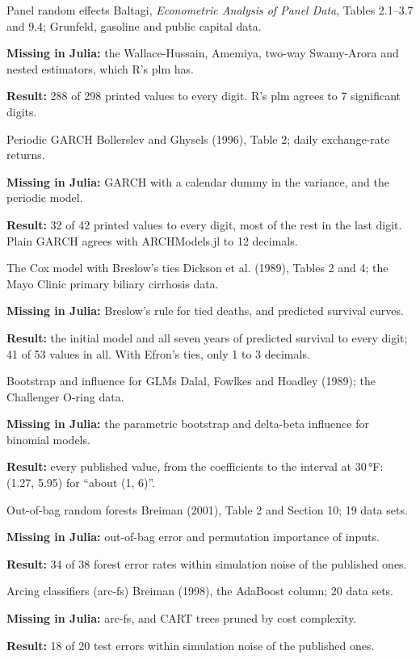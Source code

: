 \documentclass[10pt,a4paper]{article}
\begin{document}
\vspace{3mm}
\newcommand{\methodcard}[5]{%
  \begin{pbox}[equal height group=#1, fontupper=\small\raggedright]{#2}
  {\color{soft}#3}\par\smallskip
  \textbf{Missing in Julia:} #4\par\smallskip
  \textbf{Result:} #5
  \end{pbox}}
\newcommand{\cardcol}{\begin{minipage}[t]{0.320\linewidth}\vspace{0pt}}
\cardcol
\methodcard{nm1}{Panel random effects}
  {Baltagi, \emph{Econometric Analysis of Panel Data}, Tables 2.1--3.7 and 9.4; Grunfeld, gasoline and public capital data.}
  {the Wallace-Hussain, Amemiya, two-way Swamy-Arora and nested estimators, which R's plm has.}
  {288 of 298 printed values to every digit. R's plm agrees to 7 significant digits.}
\end{minipage}\hfill
\cardcol
\methodcard{nm1}{Periodic GARCH}
  {Bollerslev and Ghysels (1996), Table 2; daily exchange-rate returns.}
  {GARCH with a calendar dummy in the variance, and the periodic model.}
  {32 of 42 printed values to every digit, most of the rest in the last digit. Plain GARCH agrees with ARCHModels.jl to 12 decimals.}
\end{minipage}\hfill
\cardcol
\methodcard{nm1}{The Cox model with Breslow's ties}
  {Dickson et al. (1989), Tables 2 and 4; the Mayo Clinic primary biliary cirrhosis data.}
  {Breslow's rule for tied deaths, and predicted survival curves.}
  {the initial model and all seven years of predicted survival to every digit; 41 of 53 values in all. With Efron's ties, only 1 to 3 decimals.}
\end{minipage}

\vspace{3mm}
\cardcol
\methodcard{nm2}{Bootstrap and influence for GLMs}
  {Dalal, Fowlkes and Hoadley (1989); the Challenger O-ring data.}
  {the parametric bootstrap and delta-beta influence for binomial models.}
  {every published value, from the coefficients to the interval at 30\,°F: (1.27, 5.95) for ``about (1, 6)''.}
\end{minipage}\hfill
\cardcol
\methodcard{nm2}{Out-of-bag random forests}
  {Breiman (2001), Table 2 and Section 10; 19 data sets.}
  {out-of-bag error and permutation importance of inputs.}
  {34 of 38 forest error rates within simulation noise of the published ones.}
\end{minipage}\hfill
\cardcol
\methodcard{nm2}{Arcing classifiers (arc-fs)}
  {Breiman (1998), the AdaBoost column; 20 data sets.}
  {arc-fs, and CART trees pruned by cost complexity.}
  {18 of 20 test errors within simulation noise of the published ones.}
\end{minipage}
\end{document}
